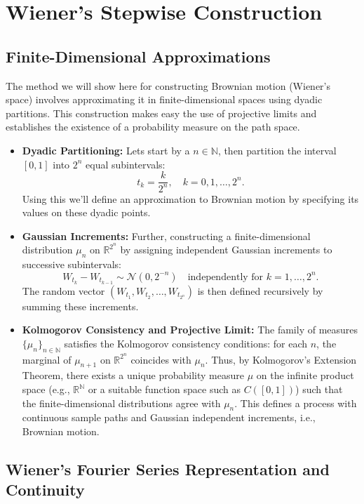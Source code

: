 \documentclass[12pt]{report}
\begin{document}
\section{Wiener’s Stepwise Construction}
\subsection{Finite-Dimensional Approximations}

The method we will show here for constructing Brownian motion (Wiener's space) involves approximating it in finite-dimensional spaces using dyadic partitions. This construction makes easy the use of projective limits and establishes the existence of a probability measure on the path space.

\begin{itemize}
    \item \textbf{Dyadic Partitioning:}  
    Lets start by a \( n \in \mathbb{N} \), then partition the interval \([0,1]\) into \(2^n\) equal subintervals:
    \[
    t_k = \frac{k}{2^n}, \quad k = 0, 1, \dotsc, 2^n.
    \]
    Using this we'll define an approximation to Brownian motion by specifying its values on these dyadic points.

    \item \textbf{Gaussian Increments:}  
    Further, constructing a finite-dimensional distribution \(\mu_n\) on \(\mathbb{R}^{2^n}\) by assigning independent Gaussian increments to successive subintervals:
    \[
    W_{t_k} - W_{t_{k-1}} \sim \mathcal{N}(0, 2^{-n}) \quad \text{independently for } k = 1, \dotsc, 2^n.
    \]
    The random vector \( (W_{t_1}, W_{t_2}, \ldots, W_{t_{2^n}}) \) is then defined recursively by summing these increments.

    \item \textbf{Kolmogorov Consistency and Projective Limit:}  
    The family of measures \( \{\mu_n\}_{n \in \mathbb{N}} \) satisfies the Kolmogorov consistency conditions: for each \( n \), the marginal of \(\mu_{n+1}\) on \( \mathbb{R}^{2^n} \) coincides with \( \mu_n \). Thus, by Kolmogorov’s Extension Theorem, there exists a unique probability measure \( \mu \) on the infinite product space (e.g., \( \mathbb{R}^{\mathbb{N}} \) or a suitable function space such as \( C([0,1]) \)) such that the finite-dimensional distributions agree with \(\mu_n\). This defines a process with continuous sample paths and Gaussian independent increments, i.e., Brownian motion.
\end{itemize}

\subsection{Wiener’s Fourier Series Representation and Continuity}
\end{document}
